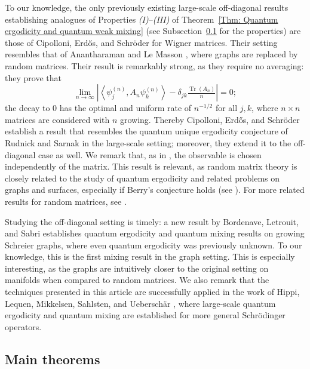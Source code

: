 \documentclass[11pt,twoside,reqno]{amsart} \usepackage{a4wide} \usepackage[T1]{fontenc} \usepackage[utf8]{inputenc} \usepackage{soul}  \usepackage{amsmath} \usepackage{amsfonts} \usepackage{amssymb} \usepackage{mathtools} \usepackage{amsthm} \usepackage{xcolor} \usepackage{graphicx} \usepackage{hyperref} \usepackage{standalone} \usepackage{esint} \usepackage{comment} \usepackage[left=2.3cm,top=3cm,right=2.3cm]{geometry} \usepackage{bm} \usepackage{svg} \usepackage{float} \numberwithin{equation}{section} \theoremstyle{plain} \newtheorem{thm}{Theorem}[section] \newtheorem{theorem}[thm]{Theorem} \newtheorem*{theorem*}{Theorem}\newtheorem{conj}[thm]{Conjecture} \newtheorem{lemma}[thm]{Lemma} \newtheorem{prop}[thm]{Proposition} \newtheorem{proposition}[thm]{Proposition} \newtheorem{cor}[thm]{Corollary} \newtheorem{question}[thm]{Question} \newtheorem{corollary}[thm]{Corollary} \newtheorem{assumption}[thm]{Assumption} \theoremstyle{definition} \newtheorem{defn}[thm]{Definition} \newtheorem{choice}[thm]{Choice} \newtheorem{definition}[thm]{Definition} \newtheorem{ex}[thm]{Example} \newtheorem{notation}[thm]{Notation} \newtheorem*{ack}{Acknowledgements} \theoremstyle{remark} \newtheorem{remark}[thm]{Remark} \newtheorem{bigremark}[thm]{Remark} \usepackage{xcolor} \newcommand{\red}[1]{ {\color{Red}#1} } \newcommand{\blue}[1]{ {\color{Blue}#1} } \author{Kai Hippi} \address{Aalto University, Espoo, Finland} \email{kai.hippi@aalto.fi}
\begin{document}
To our knowledge, the only previously existing large-scale off-diagonal results establishing analogues of Properties \emph{(I)}--\emph{(III)} of Theorem~\ref{Thm: Quantum ergodicity and quantum weak mixing} (see Subsection~\ref{Ssec: Main theorems} for the properties) are those of Cipolloni, Erdős, and Schröder \cite{CES21} for Wigner matrices. Their setting resembles that of Anantharaman and Le Masson \cite{AL15}, where graphs are replaced by random matrices. Their result is remarkably strong, as they require no averaging: they prove that
$$
\lim_{n \to \infty} \left| \left\langle \psi_j^{(n)}, A_n \psi_k^{(n)} \right\rangle  - \delta_{jk}\tfrac{ \operatorname{Tr}(A_{n}) }{n} \right| = 0;
$$
the decay to $ 0 $ has the optimal and uniform rate of $n^{-1/2}$ for all $j,k$, where $ n \times n $ matrices are considered with $ n $ growing. Thereby Cipolloni, Erdős, and Schröder \cite{CES21} establish a result that resembles the quantum unique ergodicity conjecture of Rudnick and Sarnak \cite{RS94} in the large-scale setting; moreover, they extend it to the off-diagonal case as well. We remark that, as in \cite{BHKY17, BKY17, BHY19}, the observable is chosen independently of the matrix. This result is relevant, as random matrix theory is closely related to the study of quantum ergodicity and related problems on graphs and surfaces, especially if Berry's conjecture holds (see \cite{Ber77}). For more related results for random matrices, see \cite{ESY09a, ESY09b, BY17}. 

Studying the off-diagonal setting is timely: a new result by Bordenave, Letrouit, and Sabri \cite{BLS26} establishes quantum ergodicity and quantum mixing results on growing Schreier graphs, where even quantum ergodicity was previously unknown. To our knowledge, this is the first mixing result in the graph setting. This is especially interesting, as the graphs are intuitively closer to the original setting on manifolds when compared to random matrices. We also remark that the techniques presented in this article are successfully applied in the work of Hippi, Lequen, Mikkelsen, Sahlsten, and Ueberschär \cite{HLMSU26}, where large-scale quantum ergodicity and quantum mixing are established for more general Schrödinger operators.




\subsection{Main theorems}
\label{Ssec: Main theorems}
\end{document}
